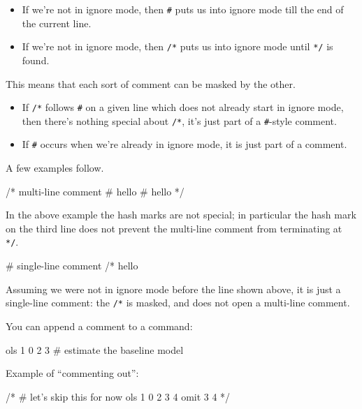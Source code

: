 \begin{itemize}
\item If we're not in ignore mode, then \texttt{\#} puts us into ignore
  mode till the end of the current line.
\item If we're not in ignore mode, then \texttt{/*} puts us into ignore
  mode until \texttt{*/} is found.
\end{itemize}

This means that each sort of comment can be masked by the other.  

\begin{itemize}
\item If \texttt{/*} follows \texttt{\#} on a given line which does
  not already start in ignore mode, then there's nothing special about
  \texttt{/*}, it's just part of a \texttt{\#}-style comment.
\item If \texttt{\#} occurs when we're already in ignore mode, it is
  just part of a comment.
\end{itemize}

A few examples follow.
%
\begin{code}
/* multi-line comment
   # hello
   # hello */
\end{code}
%
In the above example the hash marks are not special; in particular
the hash mark on the third line does not prevent the multi-line
comment from terminating at \texttt{*/}.
%
\begin{code}
# single-line comment /* hello
\end{code}
%
Assuming we were not in ignore mode before the line shown above, it is
just a single-line comment: the \texttt{/*} is masked, and does not
open a multi-line comment.

You can append a comment to a command:
%
\begin{code}
ols 1 0 2 3 # estimate the baseline model
\end{code}
%
Example of ``commenting out'':
%
\begin{code}
/*
# let's skip this for now
ols 1 0 2 3 4
omit 3 4
*/
\end{code}
